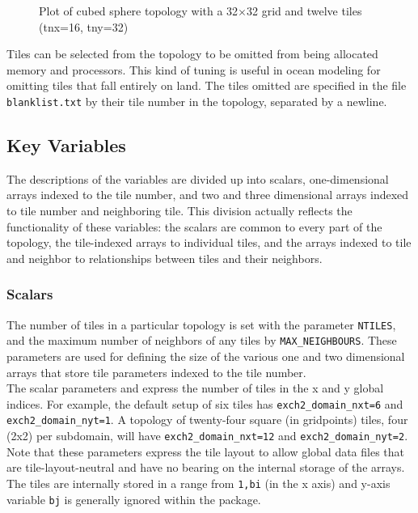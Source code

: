 \begin{figure}
\begin{center}
\end{center} 
\caption{Plot of cubed sphere topology with a 32$\times$32 grid and
twelve tiles (tnx=16, tny=32)
} \label{fig:12tile}
\end{figure}

Tiles can be selected from the topology to be omitted from being
allocated memory and processors.  This kind of tuning is useful in
ocean modeling for omitting tiles that fall entirely on land.  The
tiles omitted are specified in the file \texttt{blanklist.txt} by
their tile number in the topology, separated by a newline. \\






\subsection{Key Variables}

The descriptions of the variables are divided up into scalars,
one-dimensional arrays indexed to the tile number, and two and three
dimensional arrays indexed to tile number and neighboring tile.  This
division actually reflects the functionality of these variables: the
scalars are common to every part of the topology, the tile-indexed
arrays to individual tiles, and the arrays indexed to tile and
neighbor to relationships between tiles and their neighbors.

\subsubsection{Scalars}

The number of tiles in a particular topology is set with the parameter
\texttt{NTILES}, and the maximum number of neighbors of any tiles by
\texttt{MAX\_NEIGHBOURS}.  These parameters are used for defining the
size of the various one and two dimensional arrays that store tile
parameters indexed to the tile number.\\

The scalar parameters 
and  express the number
of tiles in the x and y global indices.  For example, the default
setup of six tiles has \texttt{exch2\_domain\_nxt=6} and
\texttt{exch2\_domain\_nyt=1}.  A topology of twenty-four square (in
gridpoints) tiles, four (2x2) per subdomain, will have
\texttt{exch2\_domain\_nxt=12} and \texttt{exch2\_domain\_nyt=2}.
Note that these parameters express the tile layout to allow global
data files that are tile-layout-neutral and have no bearing on the
internal storage of the arrays.  The tiles are internally stored in a
range from \texttt{1,bi} (in the x axis) and y-axis variable
\texttt{bj} is generally ignored within the package.

